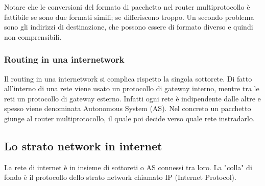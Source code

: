 Notare che le conversioni del formato di pacchetto nel router multiprotocollo è fattibile se sono due formati simili;
se differiscono troppo.
Un secondo problema sono gli indirizzi di destinazione, che possono essere di formato diverso e quindi non comprensibili.

\subsubsection{Routing in una internetwork}
Il routing in una internetwork si complica rispetto la singola sottorete.
Di fatto all'interno di una rete viene usato un protocollo di gateway interno, mentre tra le reti un protocollo di gateway esterno.
Infatti ogni rete è indipendente dalle altre e spesso viene denominata Autonomous System (AS).
Nel concreto un pacchetto giunge al router multiprotocollo, il quale poi decide verso quale rete instradarlo.

\subsection{Lo strato network in internet} %
La rete di internet è in insieme di sottoreti o AS connessi tra loro.
La "colla" di fondo è il protocollo dello strato network chiamato IP (Internet Protocol).

